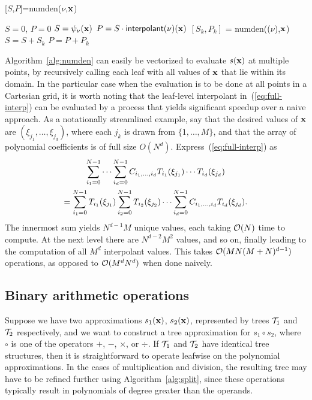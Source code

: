 \begin{algorithm}
\caption{[$S$,$P$]=numden($\nu$,$\mathbf{x}$)}
\label{alg:numden}
\begin{algorithmic}
\STATE $S=0$, $P=0$
\STATE $S=\psi_\nu(\mathbf{x})$
\STATE $P = S \cdot \textsf{interpolant}(\nu)(\mathbf{x})$
\ELSE
{}
\STATE $[S_k,P_k]$ = numden(($\nu$),$\mathbf{x}$) 
\STATE $S = S + S_k$
\STATE $P = P + P_k$
\ENDIF
\ENDFOR
\ENDIF
\end{algorithmic}
\end{algorithm}

Algorithm~\ref{alg:numden} can easily be vectorized to evaluate $s(\mathbf{x})$ at multiple points, by recursively calling each leaf with all values of $\mathbf{x}$ that lie within its domain. In the particular case when the evaluation is to be done at all points in a Cartesian grid, it is worth noting that the leaf-level interpolant in~(\ref{eq:full-interp}) can be evaluated by a process that yields significant speedup over a naive approach. As a notationally streamlined example, say that the desired values of $\mathbf{x}$ are $(\xi_{j_1},\ldots,\xi_{j_d})$, where each $j_k$ is drawn from $\{1,\ldots,M\}$, and that the array of polynomial coefficients is of full size $O(N^d)$. Express~(\ref{eq:full-interp}) as
\begin{multline}
  \label{eq:grid-eval}
  \sum_{i_1=0}^{N-1} \cdots \sum_{i_d=0}^{N-1}  C_{i_1,\ldots,i_d} T_{i_1}(\xi_{j_1})\cdots T_{i_d}(\xi_{j_d})
  \\ = \sum_{i_1=0}^{N-1} T_{i_1}(\xi_{j_1}) \sum_{i_2=0}^{N-1} T_{i_2}(\xi_{j_2}) \cdots \sum_{i_d=0}^{N-1}  C_{i_1,\ldots,i_d} T_{i_d}(\xi_{j_d}).
\end{multline}
The innermost sum yields $N^{d-1}M$ unique values, each taking $\mathcal{O}(N)$ time to compute. At the next level there are $N^{d-2}M^2$ values, and so on, finally leading to the computation of all $M^d$ interpolant values. This takes $\mathcal{O}(MN(M+N)^{d-1})$ operations, as opposed to $\mathcal{O}(M^dN^d)$ when done naively. 



\subsection{Binary arithmetic operations}

Suppose we have two approximations ${s}_1(\mathbf{x})$, ${s}_2(\mathbf{x})$, represented by trees $\mathcal{T}_1$ and $\mathcal{T}_2$ respectively, and we want to construct a tree approximation for ${s}_1 \circ {s}_2$, where $\circ$ is one of the operators $+$, $-$, $\times$, or $\div$. If $\mathcal{T}_1$ and $\mathcal{T}_2$ have identical tree structures, then it is straightforward to operate leafwise on the polynomial approximations. In the cases of multiplication and division, the resulting tree may have to be refined further using Algorithm~\ref{alg:split}, since these operations typically result in polynomials of degree greater than the operands. 

